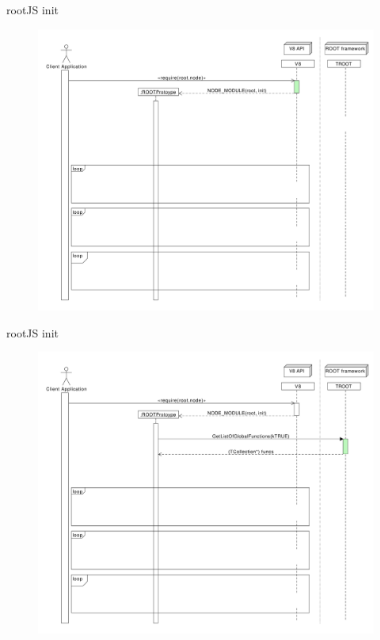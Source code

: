 \begin{frame}{rootJS init}
  \begin{figure}[htb]
    \centering
      \includegraphics[width=\textwidth, height=.85\textheight, keepaspectratio]{./resources/initialize/initialize_h2.pdf}
  \end{figure}
\end{frame}

\begin{frame}{rootJS init}
  \begin{figure}[htb]
    \centering
      \includegraphics[width=\textwidth, height=.85\textheight, keepaspectratio]{./resources/initialize/initialize_h3.pdf}
  \end{figure}
\end{frame}

